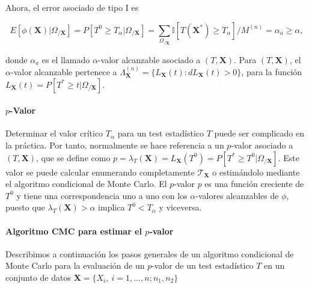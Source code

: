 	Ahora, el error asociado de tipo I es 
	
	\[ 
		E[ \phi(\mathbf{X}) | \Omega_{/\mathbf{X}}] =
		P[ T^0 \geq T_\alpha | \Omega_{/\mathbf{X}}] =
		\sum\limits_{\Omega_{/\mathbf{X}}}
			\mathbb{I}[ T(\mathbf{X}^*) \geq T_\alpha ]/
				M^{(n)} =
		\alpha_a \geq
		\alpha,
	\] 
	
	donde $\alpha_a$ es el llamado $\alpha$-valor alcanzable asociado a $(T, \mathbf{X})$. Para $(T,\mathbf{X})$, el $\alpha$-valor alcanzable pertenece a $\Lambda_\mathbf{X}^{(n)} = \{ L_\mathbf{X}(t): dL_\mathbf{X}(t) > 0 \}$, para la función $ L_\mathbf{X}(t) = P[ T^* \geq t | \Omega_{/\mathbf{X}}] $. 
	
\paragraph{$p$-Valor} Determinar el valor crítico $T_\alpha$ para un test estadístico $T$ puede ser complicado en la práctica. Por tanto, normalmente se hace referencia a un $p$-valor asociado a $(T, \mathbf{X})$, que se define como $p = \lambda_T(\mathbf{X}) = L_\mathbf{X}(T^0) = P[ T^* \geq T^0 | \Omega_{/\mathbf{X}}]$. Este valor se puede calcular enumerando completamente $\mathcal{T}_\mathbf{X}$ o estimándolo mediante el algoritmo condicional de Monte Carlo. El $p$-valor $p$ es una función creciente de $T^0$ y tiene una  correspondencia uno a uno con los $\alpha$-valores alcanzables de $\phi$, puesto que $\lambda_T(\mathbf{X}) > \alpha$ implica $T^0 < T_\alpha$ y viceversa.

\paragraph{Algoritmo CMC para estimar el $p$-valor}  Describimos a continuación los pasos generales de un algoritmo condicional de Monte Carlo para la evaluación de un $p$-valor de un test estadístico $T$ en un conjunto de datos $\mathbf{X} = \{ X_i, \ i=1, \dots, n; n_1, n_2 \}$

